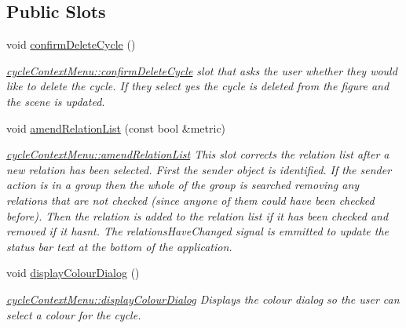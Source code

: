 \subsection*{Public Slots}
\begin{DoxyCompactItemize}
\item 
\mbox{\label{classcycle_context_menu_a844d59a74d643b19fd19eb1de11ea4e9}} 
void \mbox{\hyperlink{classcycle_context_menu_a844d59a74d643b19fd19eb1de11ea4e9}{confirm\+Delete\+Cycle}} ()
\begin{DoxyCompactList}\small\item\em \mbox{\hyperlink{classcycle_context_menu_a844d59a74d643b19fd19eb1de11ea4e9}{cycle\+Context\+Menu\+::confirm\+Delete\+Cycle}} slot that asks the user whether they would like to delete the cycle. If they select yes the cycle is deleted from the figure and the scene is updated. \end{DoxyCompactList}\item 
\mbox{\label{classcycle_context_menu_ad6adc2b3c3ad2650190967f7d4efd088}} 
void \mbox{\hyperlink{classcycle_context_menu_ad6adc2b3c3ad2650190967f7d4efd088}{amend\+Relation\+List}} (const bool \&metric)
\begin{DoxyCompactList}\small\item\em \mbox{\hyperlink{classcycle_context_menu_ad6adc2b3c3ad2650190967f7d4efd088}{cycle\+Context\+Menu\+::amend\+Relation\+List}} This slot corrects the relation list after a new relation has been selected. First the sender object is identified. If the sender action is in a group then the whole of the group is searched removing any relations that are not checked (since anyone of them could have been checked before). Then the relation is added to the relation list if it has been checked and removed if it hasn\textquotesingle{}t. The relations\+Have\+Changed signal is emmitted to update the status bar text at the bottom of the application. \end{DoxyCompactList}\item 
\mbox{\label{classcycle_context_menu_abf4f98f97561d5acd104a6c0b2038e15}} 
void \mbox{\hyperlink{classcycle_context_menu_abf4f98f97561d5acd104a6c0b2038e15}{display\+Colour\+Dialog}} ()
\begin{DoxyCompactList}\small\item\em \mbox{\hyperlink{classcycle_context_menu_abf4f98f97561d5acd104a6c0b2038e15}{cycle\+Context\+Menu\+::display\+Colour\+Dialog}} Displays the colour dialog so the user can select a colour for the cycle. \end{DoxyCompactList}\item 

\end{DoxyCompactItemize}
